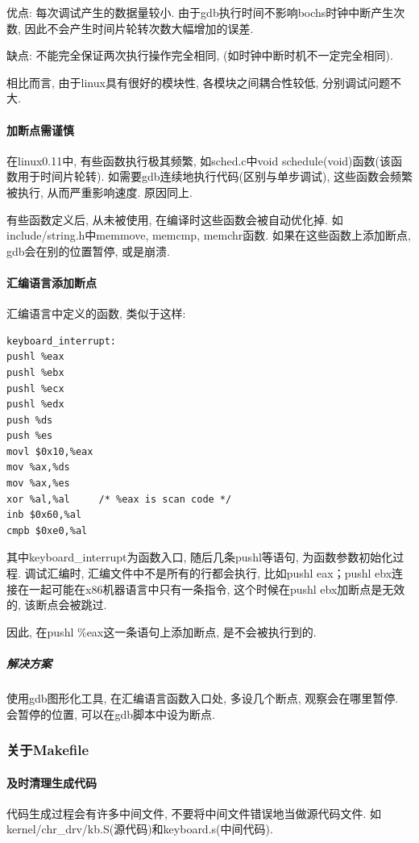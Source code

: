 \documentclass{ctexart}
\begin{document}
优点: 每次调试产生的数据量较小. 由于gdb执行时间不影响bochs时钟中断产生次数, 因此不会产生时间片轮转次数大幅增加的误差.

缺点: 不能完全保证两次执行操作完全相同, (如时钟中断时机不一定完全相同).

相比而言, 由于linux具有很好的模块性, 各模块之间耦合性较低, 分别调试问题不大.

\paragraph{加断点需谨慎}

在linux0.11中, 有些函数执行极其频繁, 如sched.c中void schedule(void)函数(该函数用于时间片轮转). 如需要gdb连续地执行代码(区别与单步调试), 这些函数会频繁被执行, 从而严重影响速度. 原因同上.

有些函数定义后, 从未被使用, 在编译时这些函数会被自动优化掉. 如include/string.h中memmove, memcmp, memchr函数. 如果在这些函数上添加断点, gdb会在别的位置暂停, 或是崩溃.

\paragraph{汇编语言添加断点}
汇编语言中定义的函数, 类似于这样:
\begin{lstlisting}
keyboard_interrupt:
pushl %eax
pushl %ebx
pushl %ecx
pushl %edx
push %ds
push %es
movl $0x10,%eax
mov %ax,%ds
mov %ax,%es
xor %al,%al		/* %eax is scan code */
inb $0x60,%al
cmpb $0xe0,%al
\end{lstlisting}
其中keyboard\_interrupt为函数入口, 随后几条pushl等语句, 为函数参数初始化过程. 调试汇编时, 汇编文件中不是所有的行都会执行, 比如pushl eax；pushl ebx连接在一起可能在x86机器语言中只有一条指令, 这个时候在pushl ebx加断点是无效的, 该断点会被跳过.

因此, 在pushl \%eax这一条语句上添加断点, 是不会被执行到的.

\subparagraph{解决方案}
使用gdb图形化工具, 在汇编语言函数入口处, 多设几个断点, 观察会在哪里暂停. 会暂停的位置, 可以在gdb脚本中设为断点.

\subsubsection{关于Makefile}
\paragraph{及时清理生成代码}
代码生成过程会有许多中间文件, 不要将中间文件错误地当做源代码文件. 如kernel/chr\_drv/kb.S(源代码)和keyboard.s(中间代码).
\end{document}
